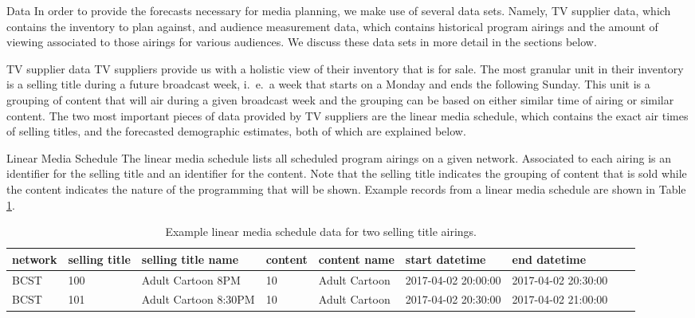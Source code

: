 \begin{chapter}{Data}\label{data}
  In order to provide the forecasts necessary for media planning, we make use
  of several data sets. Namely, TV supplier data, which contains the inventory to plan against, and
  audience measurement data, which contains historical program airings and the
  amount of viewing associated to those airings for various audiences. We discuss
  these data sets in more detail in the sections below.

\begin{section}{TV supplier data}
  TV suppliers provide us with a holistic view of their inventory that is for sale.
  The most granular unit in their inventory is a selling title during a future broadcast week, i.\ e.\ a
  week that starts on a Monday and ends the following Sunday. This
  unit is a grouping of content that will air during a given broadcast week and the grouping can be
  based on either similar time of airing or similar content. The two most important
  pieces of data provided by TV suppliers are the linear media schedule, which contains the exact air times of
  selling titles, and the forecasted demographic estimates, both of which are explained below.

  \begin{subsection}{Linear Media Schedule}
    The linear media schedule lists all scheduled program airings on a given network.
    Associated to each airing is an identifier for the selling title and an identifier for the content.
    Note that the selling title indicates the grouping of content that is sold while the content
    indicates the nature of the programming that will be shown. Example records
    from a linear media schedule are shown in Table \ref{tab:tvsched}.

    \begin{table}[h!]
      \centering
      \begin{adjustbox}{width=1.1\textwidth,center=\textwidth}
        \large
        \begin{tabular}{lllllllll}
          network & selling title & selling title name & content & content name & start datetime & end datetime \\
          \hline
          BCST & 100 & Adult Cartoon 8PM & 10 & Adult Cartoon & 2017-04-02 20:00:00 & 2017-04-02 20:30:00 \\
          BCST & 101 & Adult Cartoon 8:30PM & 10 & Adult Cartoon & 2017-04-02 20:30:00 & 2017-04-02 21:00:00 \\
        \end{tabular}
      \end{adjustbox}
      \caption{Example linear media schedule data for two selling title airings.}\label{tab:tvsched}
    \end{table}


\end{subsection}
\end{section}
\end{chapter}
